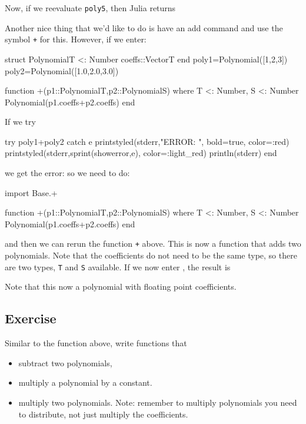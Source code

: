 Now, if we reevaluate \texttt{poly5}, then Julia returns  \printpythontex[verbatim] 

Another nice thing that we'd like to do is have an add command and use the symbol \texttt{+} for this.  However, if we enter: 
%
\begin{jlcode}
struct Polynomial{T <: Number}
  coeffs::Vector{T}
end
poly1=Polynomial([1,2,3])
poly2=Polynomial([1.0,2.0,3.0])
\end{jlcode}
\begin{jlblock}
function +(p1::Polynomial{T},p2::Polynomial{S}) where {T <: Number, S <: Number}
  Polynomial(p1.coeffs+p2.coeffs)
end
\end{jlblock}
If we try 
\begin{jlcode}
try
  poly1+poly2
catch e
  printstyled(stderr,"ERROR: ", bold=true, color=:red)
  printstyled(stderr,sprint(showerror,e), color=:light_red)
  println(stderr)
end
\end{jlcode}
we get the error:
\stderrpythontex[verbatim]
%
so we need to do:
%
\begin{jlblock}[poly]
import Base.+
\end{jlblock}
\begin{jlcode}[poly]
function +(p1::Polynomial{T},p2::Polynomial{S}) where {T <: Number, S <: Number}
  Polynomial(p1.coeffs+p2.coeffs)
end
\end{jlcode}
%
and then we can rerun the function \verb!+! above.  This is now a function that adds two polynomials.  Note that the coefficients do not need to be the same type, so there are two types, \texttt{T} and \texttt{S} available. If we now enter , the result is 
%
 \printpythontex[verbatim]

Note that this now a polynomial with floating point coefficients.

\subsection{Exercise}

Similar to the function above, write functions that 
\begin{itemize}
\item subtract two polynomials,
\item multiply a polynomial by a constant.   
\item multiply two polynomials.  Note: remember to multiply polynomials you need to distribute, not just multiply the coefficients.  
\end{itemize}

